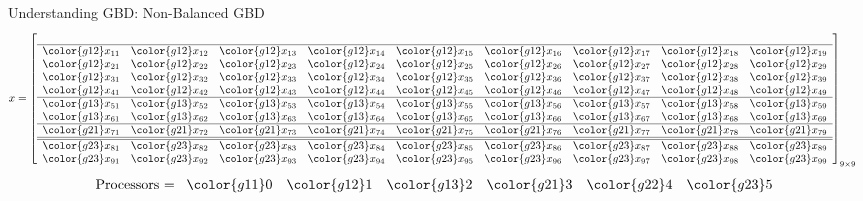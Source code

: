 \begin{frame}
\begin{exampleblock}{Understanding GBD:  Non-Balanced GBD}
\begin{align*}
x &= \left[
      \begin{array}{lllllllll}
      \\\hline
      \color{g12}x_{11} & \color{g12}x_{12} & \color{g12}x_{13} & \color{g12}x_{14} & \color{g12}x_{15} & \color{g12}x_{16} & \color{g12}x_{17} & \color{g12}x_{18} & \color{g12}x_{19}\\
      \color{g12}x_{21} & \color{g12}x_{22} & \color{g12}x_{23} & \color{g12}x_{24} & \color{g12}x_{25} & \color{g12}x_{26} & \color{g12}x_{27} & \color{g12}x_{28} & \color{g12}x_{29}\\
      \color{g12}x_{31} & \color{g12}x_{32} & \color{g12}x_{33} & \color{g12}x_{34} & \color{g12}x_{35} & \color{g12}x_{36} & \color{g12}x_{37} & \color{g12}x_{38} & \color{g12}x_{39}\\
      \color{g12}x_{41} & \color{g12}x_{42} & \color{g12}x_{43} & \color{g12}x_{44} & \color{g12}x_{45} & \color{g12}x_{46} & \color{g12}x_{47} & \color{g12}x_{48} & \color{g12}x_{49}\\\hline
      \color{g13}x_{51} & \color{g13}x_{52} & \color{g13}x_{53} & \color{g13}x_{54} & \color{g13}x_{55} & \color{g13}x_{56} & \color{g13}x_{57} & \color{g13}x_{58} & \color{g13}x_{59}\\
      \color{g13}x_{61} & \color{g13}x_{62} & \color{g13}x_{63} & \color{g13}x_{64} & \color{g13}x_{65} & \color{g13}x_{66} & \color{g13}x_{67} & \color{g13}x_{68} & \color{g13}x_{69}\\\hline
      \color{g21}x_{71} & \color{g21}x_{72} & \color{g21}x_{73} & \color{g21}x_{74} & \color{g21}x_{75} & \color{g21}x_{76} & \color{g21}x_{77} & \color{g21}x_{78} & \color{g21}x_{79}\\\hline\hline
      \color{g23}x_{81} & \color{g23}x_{82} & \color{g23}x_{83} & \color{g23}x_{84} & \color{g23}x_{85} & \color{g23}x_{86} & \color{g23}x_{87} & \color{g23}x_{88} & \color{g23}x_{89}\\
      \color{g23}x_{91} & \color{g23}x_{92} & \color{g23}x_{93} & \color{g23}x_{94} & \color{g23}x_{95} & \color{g23}x_{96} & \color{g23}x_{97} & \color{g23}x_{98} & \color{g23}x_{99}\\
      \end{array}
\right]_{9\times 9}
\end{align*}
\begin{align*}
\text{Processors = }
      \begin{array}{llllll}
      \color{g11}0 & \color{g12}1 & \color{g13}2 & \color{g21}3 & \color{g22}4 & \color{g23}5
      \end{array}
\end{align*}
\end{exampleblock}
\end{frame}

